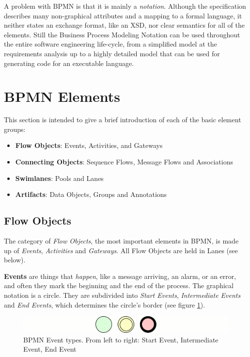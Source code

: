 A problem with BPMN is that it is mainly a \emph{notation}.  Although the
specification describes many non-graphical attributes and a mapping to a formal
language, it neither states an exchange format, like an XSD, nor clear semantics
for all of the elements.  Still the Business Process Modeling Notation can be
used throughout the entire software engineering life-cycle, from a simplified model
at the requirements analysis up to a highly detailed model that can be used for
generating code for an executable language.



\section{BPMN Elements}
\label{sec:bpmn_elements}

This section is intended to give a brief introduction of each of the basic element
groups:

\begin{itemize}
	\item \textbf{Flow Objects}: Events, Activities, and Gateways
	\item \textbf{Connecting Objects}: Sequence Flows, Message Flows and Associations
	\item \textbf{Swimlanes}: Pools and Lanes
	\item \textbf{Artifacts}: Data Objects, Groups and Annotations
\end{itemize}

\subsection{Flow Objects}

The category of \emph{Flow Objects}, the most important elements in BPMN, is made
up of \emph{Events}, \emph{Activities} and \emph{Gateways}.  All Flow Objects are
held in Lanes (see below).

\textbf{Events} are things that \emph{happen}, like a message arriving, an alarm,
or an error, and often they mark the beginning and the end of the process.  The
graphical notation is a circle.  They are subdivided into \emph{Start Events},
\emph{Intermediate Events} and \emph{End Events}, which determines the circle's
border (see figure \ref{fig:events}).

\begin{figure}[ht]
	\centering
	\includegraphics[width=.75\textwidth]{figures/bpmn/events.png}
	\caption[BPMN Event types]{BPMN Event types.  From left to right: Start Event,
	Intermediate Event, End Event}
	\label{fig:events}
\end{figure}

